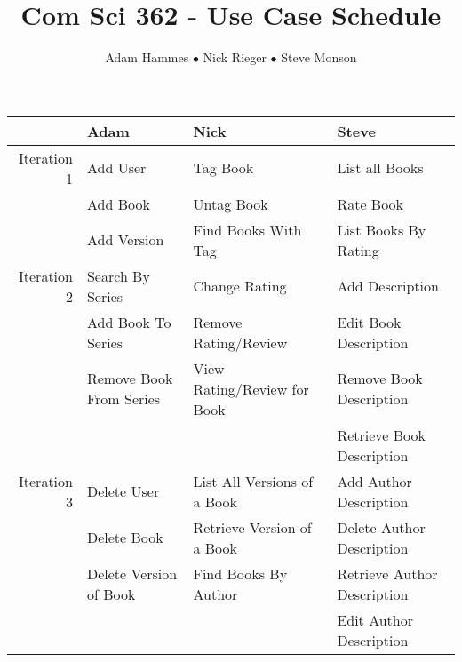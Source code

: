 \documentclass[10pt]{article}
\title{Com Sci 362 - Use Case Schedule}
\author{Adam Hammes $\bullet$ Nick Rieger $\bullet$ Steve Monson}
\begin{document}
\maketitle

\begin{center}
\begin{tabular}{| r | l | l | l |}
  \hline             & Adam                    & Nick                        & Steve                       \\ 
  \hline Iteration 1 & Add User                & Tag Book                    & List all Books              \\ 
                     & Add Book                & Untag Book                  & Rate Book                   \\ 
                     & Add Version             & Find Books With Tag         & List Books By Rating        \\
  \hline Iteration 2 & Search By Series        & Change Rating               & Add Description             \\
                     & Add Book To Series      & Remove Rating/Review        & Edit Book Description       \\
                     & Remove Book From Series & View Rating/Review for Book & Remove Book Description     \\
                     &                         &                             & Retrieve Book Description   \\
  \hline Iteration 3 & Delete User             & List All Versions of a Book & Add Author Description      \\
                     & Delete Book             & Retrieve Version of a Book  & Delete Author Description   \\
                     & Delete Version of Book  & Find Books By Author        & Retrieve Author Description \\
                     &                         &                             & Edit Author Description     \\
  \hline
\end{tabular}
\end{center}
\end{document}
